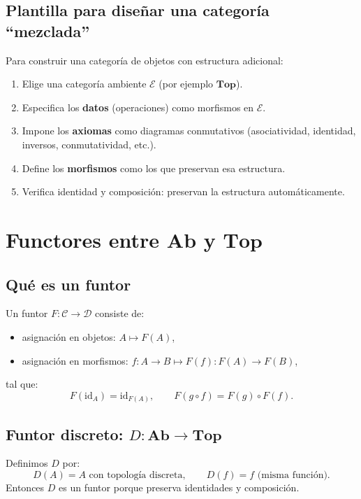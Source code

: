 \documentclass[12pt,oneside]{book}
\theoremstyle{definition}
\begin{document}
\section{Plantilla para diseñar una categoría ``mezclada''}
Para construir una categoría de objetos con estructura adicional:
\begin{enumerate}[leftmargin=1.5em]
  \item Elige una categoría ambiente $\mathcal{E}$ (por ejemplo $\mathbf{Top}$).
  \item Especifica los \textbf{datos} (operaciones) como morfismos en $\mathcal{E}$.
  \item Impone los \textbf{axiomas} como diagramas conmutativos (asociatividad, identidad, inversos, conmutatividad, etc.).
  \item Define los \textbf{morfismos} como los que preservan esa estructura.
  \item Verifica identidad y composición: preservan la estructura automáticamente.
\end{enumerate}

\chapter{Functores entre \texorpdfstring{$\mathbf{Ab}$}{Ab} y \texorpdfstring{$\mathbf{Top}$}{Top}}
\label{chap:funtores}

\section{Qué es un funtor}
Un funtor $F:\mathcal{C}\to\mathcal{D}$ consiste de:
\begin{itemize}[leftmargin=1.5em]
  \item asignación en objetos: $A\mapsto F(A)$,
  \item asignación en morfismos: $f:A\to B \mapsto F(f):F(A)\to F(B)$,
\end{itemize}
tal que:
\[
F(\mathrm{id}_A)=\mathrm{id}_{F(A)},\qquad
F(g\circ f)=F(g)\circ F(f).
\]

\section{Funtor discreto: \texorpdfstring{$D:\mathbf{Ab}\to\mathbf{Top}$}{D:Ab->Top}}
Definimos $D$ por:
\[
D(A)=\text{$A$ con topología discreta},\qquad D(f)=f \text{ (misma función)}.
\]
Entonces $D$ es un funtor porque preserva identidades y composición.
\end{document}
